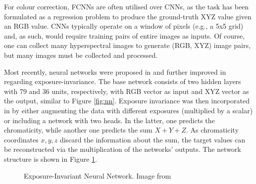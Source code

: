 For colour correction, FCNNs are often utilised over CNNs, as the task has been formulated as a regression problem to produce the ground-truth XYZ value given an RGB value. CNNs typically operate on a window of pixels (e.g., a 5x5 grid) and, as such, would require training pairs of entire images as inputs. Of course, one can collect many hyperspectral images to generate (RGB, XYZ) image pairs, but many images must be collected and processed. 


Most recently, neural networks were proposed in \cite{macdonald2021camera} and further improved in \cite{kucuk2022exposure} regarding exposure-invariance. The base network consists of two hidden layers with 79 and 36 units, respectively, with RGB vector as input and XYZ vector as the output, similar to Figure \ref{fig:nn}. Exposure invariance was then incorporated in \cite{kucuk2022exposure}  by either augmenting the data with different exposures (multiplied by a scalar) or including a network with two heads. In the latter, one predicts the chromaticity, while another one predicts the sum  $X + Y + Z$. As chromaticity coordinates $x, y, z$ discard the information about the sum, the target values can be reconstructed via the multiplication of the networks' outputs. The network structure is shown in Figure \ref{fig:nn_ei}. 

\begin{figure}
    \centering
    \caption{Exposure-Invariant Neural Network. Image from \cite{kucuk2023performance}}
    \label{fig:nn_ei}
\end{figure}

